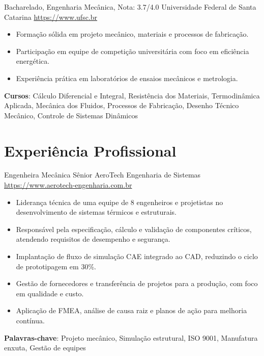 \documentclass[a4paper, serif, 10pt]{moderncv}
\begin{document}
        {Bacharelado, Engenharia Mecânica, Nota: 3.7/4.0}
        {Universidade Federal de Santa Catarina}
        {\url{https://www.ufsc.br}}
        {}
        {\begin{itemize}
\item Formação sólida em projeto mecânico, materiais e processos de fabricação.
\item Participação em equipe de competição universitária com foco em eficiência energética.
\item Experiência prática em laboratórios de ensaios mecânicos e metrologia.
\end{itemize}
\textbf{Cursos}: Cálculo Diferencial e Integral, Resistência dos Materiais, Termodinâmica Aplicada, Mecânica dos Fluidos, Processos de Fabricação, Desenho Técnico Mecânico, Controle de Sistemas Dinâmicos}
\section{Experiência Profissional}

        {Engenheira Mecânica Sênior}
        {AeroTech Engenharia de Sistemas}
        {\url{https://www.aerotech-engenharia.com.br}}
        {}
        {\begin{itemize}
\item Liderança técnica de uma equipe de 8 engenheiros e projetistas no desenvolvimento de sistemas térmicos e estruturais.
\item Responsável pela especificação, cálculo e validação de componentes críticos, atendendo requisitos de desempenho e segurança.
\item Implantação de fluxo de simulação CAE integrado ao CAD, reduzindo o ciclo de prototipagem em 30\%.
\item Gestão de fornecedores e transferência de projetos para a produção, com foco em qualidade e custo.
\item Aplicação de FMEA, análise de causa raiz e planos de ação para melhoria contínua.
\end{itemize}
\textbf{Palavras-chave}: Projeto mecânico, Simulação estrutural, ISO 9001, Manufatura enxuta, Gestão de equipes}
\end{document}

